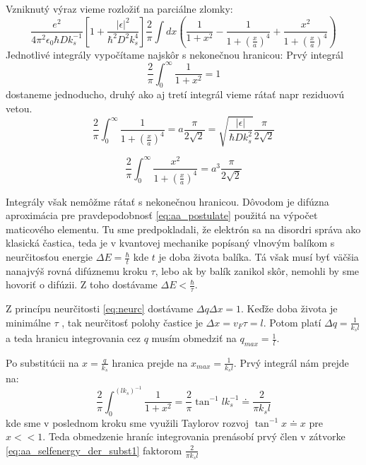  Vzniknutý výraz vieme rozložiť na parciálne zlomky:
\begin{equation}
\label{eq:aa_selfenergy_der_subst1}
\frac{e^2}{4\pi^2 \epsilon_0 \hbar D k_s^{-1}}[1+\frac{|\epsilon|^2}{\hbar^2D^2k_s^4}]\frac{2}{\pi}\int dx(\frac{1}{1+x^2}-
\frac{1}{1+(\frac{x}{a})^4}+\frac{x^2}{1+(\frac{x}{a})^4})
\end{equation}
Jednotlivé integrály vypočítame najskôr s nekonečnou hranicou:
Prvý integrál
\begin{equation}
 \label{eq:aa_int1}
 \frac{2}{\pi}\int_0^{\infty}\frac{1}{1+x^2}=1
\end{equation}
dostaneme jednoducho, druhý ako aj tretí  integrál  vieme rátať napr reziduovú vetou.
\begin{equation}
 \label{eq:aa_int2}
 \frac{2}{\pi}\int_0^{\infty}\frac{1}{1+(\frac{x}{a})^4}=a\frac{\pi}{2\sqrt{2}}=\sqrt{\frac{|\epsilon|}{\hbar D k_s^2}} \frac{\pi}{2\sqrt{2}}
\end{equation}

\begin{equation}
 \label{eq:aa_int3}
 \frac{2}{\pi}\int_0^{\infty}\frac{x^2}{1+(\frac{x}{a})^4}=a^3\frac{\pi}{2\sqrt{2}}
\end{equation}

Integrály však nemôžme rátať s nekonečnou hranicou. Dôvodom je difúzna aproximácia pre pravdepodobnosť \eqref{eq:aa_postulate}
použitá na výpočet maticového elementu. Tu sme predpokladali, že elektrón sa na disordri správa ako klasická častica,
teda je v kvantovej mechanike popísaný vlnovým balíkom s neurčitosťou energie $\Delta E=\frac{\hbar}{t}$
kde $t$ je doba života balíka. Tá však musí byť väčšia nanajvýš rovná difúznemu kroku $\tau$, lebo ak by balík zanikol skôr,
nemohli by sme hovoriť o difúzii. Z toho dostávame  $\Delta E<\frac{\hbar}{\tau}$.

Z princípu neurčitosti \eqref{eq:neurc} dostávame $\Delta q \Delta x=1$. Keďže doba života je minimálne $\tau$ , tak neurčitosť
polohy častice je $\Delta x=v_F \tau=l$. Potom platí $\Delta q=\frac{1}{k_s l}$ a teda hranicu integrovania cez $q$ musím obmedziť
na $q_{max}=\frac{1}{l}$.

Po substitúcii  na $x=\frac{q}{k_s}$ hranica prejde na  $x_{max}=\frac{1}{k_sl}$. Prvý integrál nám prejde na:
\begin{equation}
 \label{eq:aa_int1_capped}
 \frac{2}{\pi}\int_0^{(l k_s)^{-1}}\frac{1}{1+x^2}= \frac{2}{\pi}\tan^{-1}{lk_s^{-1}}\doteq \frac{2}{\pi k_s l}
\end{equation}
kde sme v poslednom kroku sme využili Taylorov rozvoj $\tan^{-1}{x}\doteq x$ pre  $x<<1$.
Teda  obmedzenie hraníc integrovania prenásobí prvý člen v zátvorke \eqref{eq:aa_selfenergy_der_subst1}  faktorom $\frac{2}{\pi k_s l}$

